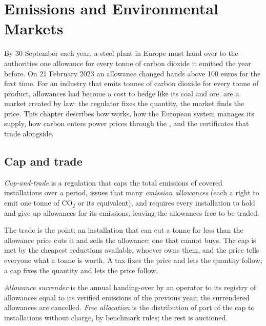 \chapter{Emissions and Environmental Markets}\label{ch:m3:emissions-and-environmental-markets}

By 30 September each year, a steel plant in Europe must hand over to the authorities one
allowance for every tonne of carbon dioxide it emitted the year before. On 21 February
2023 an allowance changed hands above 100 euros for the first time. For an industry
that emits tonnes of carbon dioxide for every tonne of product, allowances had become a
cost to hedge like its coal and ore.  are a market created by law: the regulator fixes the quantity,
the market finds the price. This chapter describes how  works, how the
European system manages its supply, how carbon enters power prices through the , and the certificates that trade alongside.

\section{Cap and trade}

\begin{definition}\label{def:m3:emissions-and-environmental-markets:cap}
\emph{Cap-and-trade} is a regulation that caps the total emissions of
covered installations over a period, issues that many \emph{emission
allowances} (each a right to emit one tonne of CO$_2$ or its
equivalent), and requires every installation to hold and give up allowances for its
emissions, leaving the allowances free to be traded.
\end{definition}

The trade is the point: an installation that can cut a tonne for less than the allowance
price cuts it and sells the allowance; one that cannot buys. The cap is met by the cheapest
reductions available, whoever owns them, and the price tells everyone what a tonne is
worth. A tax fixes the price and lets the quantity follow; a cap fixes the quantity and lets
the price follow.

\begin{definition}\label{def:m3:emissions-and-environmental-markets:surrender}
\emph{Allowance surrender} is the annual handing-over by an
operator to its registry of allowances equal to its verified emissions of the previous year;
the surrendered allowances are cancelled. \emph{Free allocation} is the
distribution of part of the cap to installations without charge, by benchmark rules; the rest
is auctioned.
\end{definition}

